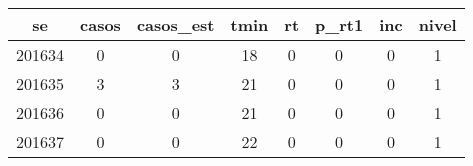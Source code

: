 \begin{tabular}{c|ccccccc}
  \hline
se & casos & casos\_est & tmin & rt & p\_rt1 & inc & nivel \\ 
  \hline
201634 & 0 & 0 & 18 & 0 & 0 & 0 & 1 \\ 
  201635 & 3 & 3 & 21 & 0 & 0 & 0 & 1 \\ 
  201636 & 0 & 0 & 21 & 0 & 0 & 0 & 1 \\ 
  201637 & 0 & 0 & 22 & 0 & 0 & 0 & 1 \\ 
   \hline
\end{tabular}
